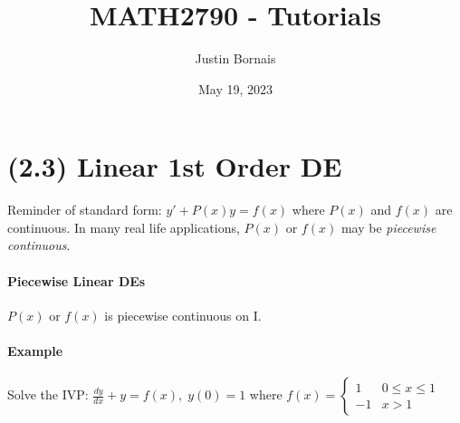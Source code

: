 \documentclass{article}
\title{MATH2790 - Tutorials}
\author{Justin Bornais}
\date{May 19, 2023}
\begin{document}
\maketitle
\section{(2.3) Linear 1st Order DE}
Reminder of standard form: $y'+P(x)y=f(x)$ where $P(x)$ and $f(x)$ are continuous. In many real life applications, $P(x)$ or $f(x)$ may be \textit{piecewise continuous}.

\paragraph{Piecewise Linear DEs} $P(x)$ or $f(x)$ is piecewise continuous on I.
\paragraph{Example} Solve the IVP: $\frac{dy}{dx}+y=f(x),\;y(0)=1$
where $f(x)=
\begin{cases}
    1 & 0\leq x\leq 1 \\
    -1 & x > 1
\end{cases}
$
\end{document}
